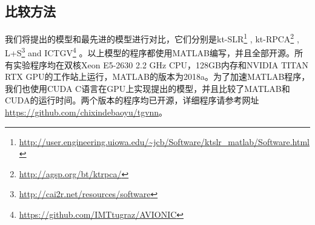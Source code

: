 \subsection{比较方法}
我们将提出的模型和最先进的模型进行对比，它们分别是kt-SLR\footnote{\url{http://user.engineering.uiowa.edu/~jcb/Software/ktslr_matlab/Software.html}} \cite{Sajan2011Accelerated}, kt-RPCA\footnote{\url{http://agsp.org/bt/ktrpca/}} \cite{tremoulheac}, L+S\footnote{\url{http://cai2r.net/resources/software}} \cite{lpluss} and ICTGV\footnote{\url{https://github.com/IMTtugraz/AVIONIC}} \cite{infimaltgv}。以上模型的程序都使用MATLAB编写，并且全部开源。所有实验程序均在双核Xeon E5-2630 2.2 GHz CPU，128GB内存和NVIDIA TITAN RTX GPU的工作站上运行，MATLAB的版本为2018a。为了加速MATLAB程序，我们也使用CUDA C语言在GPU上实现提出的模型，并且比较了MATLAB和CUDA的运行时间。两个版本的程序均已开源，详细程序请参考网址\url{https://github.com/chixindebaoyu/tgvnn}。

